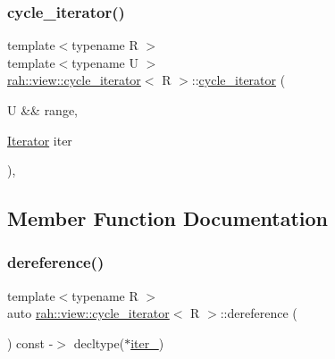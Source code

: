 \mbox{\label{structrah_1_1view_1_1cycle__iterator_a69b737bdbd97194bb5cfc0470fd60e58}} 
\subsubsection{\texorpdfstring{cycle\_iterator()}{cycle\_iterator()}\hspace{0.1cm}{\footnotesize\ttfamily [2/2]}}
{\footnotesize\ttfamily template$<$typename R $>$ \\
template$<$typename U $>$ \\
\mbox{\hyperlink{structrah_1_1view_1_1cycle__iterator}{rah\+::view\+::cycle\+\_\+iterator}}$<$ R $>$\+::\mbox{\hyperlink{structrah_1_1view_1_1cycle__iterator}{cycle\+\_\+iterator}} (\begin{DoxyParamCaption}\item[{U \&\&}]{range,  }\item[{\mbox{\hyperlink{structrah_1_1view_1_1cycle__iterator_ac9761016862e6bb26b0ca5e923344b83}{Iterator}}}]{iter }\end{DoxyParamCaption})\hspace{0.3cm}{\ttfamily [inline]}, {\ttfamily [explicit]}}



\subsection{Member Function Documentation}
\mbox{\label{structrah_1_1view_1_1cycle__iterator_a06349419766f9078983fa3db221a3bd8}} 
\subsubsection{\texorpdfstring{dereference()}{dereference()}\hspace{0.1cm}{\footnotesize\ttfamily [1/2]}}
{\footnotesize\ttfamily template$<$typename R $>$ \\
auto \mbox{\hyperlink{structrah_1_1view_1_1cycle__iterator}{rah\+::view\+::cycle\+\_\+iterator}}$<$ R $>$\+::dereference (\begin{DoxyParamCaption}{ }\end{DoxyParamCaption}) const -\/$>$ decltype($\ast$\mbox{\hyperlink{structrah_1_1view_1_1cycle__iterator_a49dea5baf32f7e9bc237b6f534513ada}{iter\+\_\+}}) \hspace{0.3cm}{\ttfamily [inline]}}

